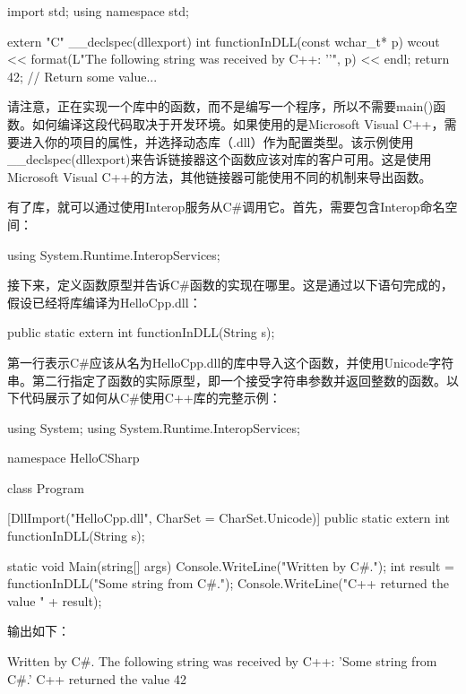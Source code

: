 \begin{cpp}
import std;
using namespace std;

extern "C"
{
    __declspec(dllexport) int functionInDLL(const wchar_t* p)
    {
        wcout << format(L"The following string was received by C++: '{}'", p)
        << endl;
        return 42; // Return some value...
    }
}
\end{cpp}

请注意，正在实现一个库中的函数，而不是编写一个程序，所以不需要main()函数。如何编译这段代码取决于开发环境。如果使用的是Microsoft Visual C++，需要进入你的项目的属性，并选择动态库（.dll）作为配置类型。该示例使用\_\_declspec(dllexport)来告诉链接器这个函数应该对库的客户可用。这是使用Microsoft Visual C++的方法，其他链接器可能使用不同的机制来导出函数。

有了库，就可以通过使用Interop服务从C\#调用它。首先，需要包含Interop命名空间：

\begin{cpp}
using System.Runtime.InteropServices;
\end{cpp}

接下来，定义函数原型并告诉C\#函数的实现在哪里。这是通过以下语句完成的，假设已经将库编译为HelloCpp.dll：

\begin{cpp}
[DllImport("HelloCpp.dll", CharSet = CharSet.Unicode)] public static extern int functionInDLL(String s);
\end{cpp}

第一行表示C\#应该从名为HelloCpp.dll的库中导入这个函数，并使用Unicode字符串。第二行指定了函数的实际原型，即一个接受字符串参数并返回整数的函数。以下代码展示了如何从C\#使用C++库的完整示例：

\begin{cpp}
using System;
using System.Runtime.InteropServices;

namespace HelloCSharp
{
    class Program
    {
        [DllImport("HelloCpp.dll", CharSet = CharSet.Unicode)]
        public static extern int functionInDLL(String s);

        static void Main(string[] args)
        {
            Console.WriteLine("Written by C#.");
            int result = functionInDLL("Some string from C#.");
            Console.WriteLine("C++ returned the value " + result);
        }
    }
}
\end{cpp}

输出如下：

\begin{shell}
Written by C#.
The following string was received by C++: 'Some string from C#.'
C++ returned the value 42
\end{shell}


